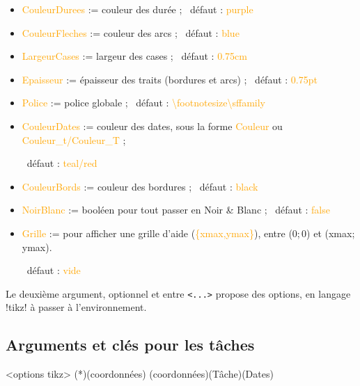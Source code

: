 \documentclass[french,a4paper,11pt]{article}
\newcommand\Cle[1]{{\small\sffamily\textlangle \textcolor{orange}{#1}\textrangle}}
\begin{document}
{{\begin{tipblock}
\begin{itemize}
	\item \Cle{CouleurDurees} := couleur des durée ; \hfill~défaut : \Cle{purple}
	\item \Cle{CouleurFleches} := couleur des arcs ; \hfill~défaut : \Cle{blue}
	\item \Cle{LargeurCases} := largeur des cases ; \hfill~défaut : \Cle{0.75cm}
	\item \Cle{Epaisseur} := épaisseur des traits (bordures et arcs) ; \hfill~défaut : \Cle{0.75pt}
	\item \Cle{Police} := police globale ; \hfill~défaut : \Cle{\textbackslash footnotesize\textbackslash sffamily}
	\item \Cle{CouleurDates} := couleur des dates, sous la forme \Cle{Couleur} ou \Cle{Couleur\_t/Couleur\_T} ;
	
	\hfill~défaut : \Cle{teal/red}
	\item \Cle{CouleurBords} := couleur des bordures ; \hfill~défaut : \Cle{black}
	\item \Cle{NoirBlanc} := booléen pour tout passer en Noir \&{} Blanc ; \hfill~défaut : \Cle{false}
	\item \Cle{Grille} := pour afficher une grille d'aide (\Cle{\{xmax,ymax\}}), entre (0;\,0) et (xmax;\,ymax).
	
	\hfill~défaut : \Cle{vide}
\end{itemize}

Le deuxième argument, optionnel et entre \texttt{<...>} propose des options, en langage \packagetex!tikz! à passer à l'environnement.
\end{tipblock}

\begin{DemoCode}[]
\begin{GrapheMPM}[Grille={14,5}]
\end{GrapheMPM}
\end{DemoCode}

\pagebreak

\subsection{Arguments et clés pour les tâches}

\begin{DemoCode}
\begin{GrapheMPM}[clés]<options tikz>
	\MPMPlaceNotice(*)(coordonnées)
	\MPMPlaceTache(coordonnées)(Tâche)(Dates)
\end{GrapheMPM}
\end{DemoCode}

}}
\end{document}
